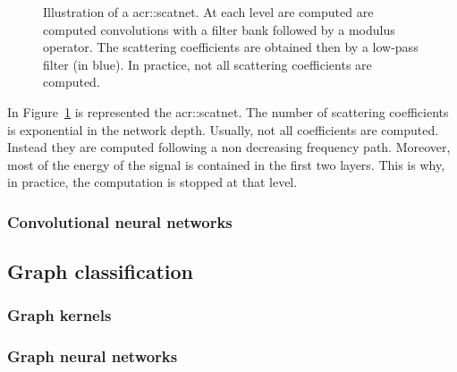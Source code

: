             \begin{figure}
                \centering
                
                \caption{
                    \label{fig::scatnet} Illustration of a \gls{acr::scatnet}.
                    At each level are computed are computed convolutions with a filter bank followed by a modulus operator.
                    The scattering coefficients are obtained then by a low-pass filter (in blue).
                    In practice, not all scattering coefficients are computed.
                }
            \end{figure}

            In Figure~\ref{fig::scatnet} is represented the \acrlong{acr::scatnet}.
            The number of scattering coefficients is exponential in the network depth.
            Usually, not all coefficients are computed.
            Instead they are computed following a non decreasing frequency path.
            Moreover, most of the energy of the signal is contained in the first two layers.
            This is why, in practice, the computation is stopped at that level.

        \subsubsection{Convolutional neural networks}
    \subsection{Graph classification}
        \label{subsec::state_of_the_art::mlpr::graph_classification}

        \subsubsection{Graph kernels}
        \subsubsection{Graph neural networks}
